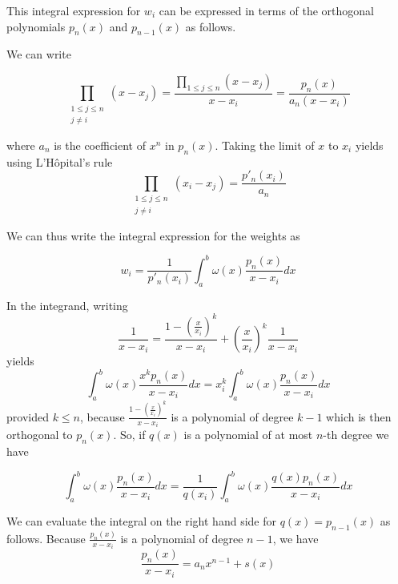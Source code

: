 This integral expression for $w_{i}$ can be expressed in terms of the orthogonal polynomials $p_{n}(x)$ and $p_{n-1}(x)$ as follows.

We can write

\begin{equation}
\prod_{\begin{smallmatrix}1\leq j\leq n\\j\neq i\end{smallmatrix}}\left(x-x_{j}\right) = \frac{\prod_{1\leq j\leq n} \left(x - x_{j}\right)}{x-x_{i}} = \frac{p_{n}(x)}{a_{n}\left(x-x_{i}\right)}
\end{equation}

where $a_{n}$ is the coefficient of $x^n$ in $p_{n}(x)$. Taking the limit of $x$ to $x_{i}$ yields using L'Hôpital's rule
\begin{equation}
\prod_{\begin{smallmatrix}1\leq j\leq n\\j\neq i\end{smallmatrix}}\left(x_{i}-x_{j}\right) = \frac{p'_{n}(x_{i})}{a_{n}}    
\end{equation}


 We can thus write the integral expression for the weights as

 \begin{equation}
     w_{i} = \frac{1}{p'_{n}(x_{i})}\int_{a}^{b}\omega(x)\frac{p_{n}(x)}{x-x_{i}}dx
 \end{equation}

 In the integrand, writing
 \begin{equation}
     \frac{1}{x-x_i} = \frac{1 - \left(\frac{x}{x_i}\right)^{k}}{x - x_i} + \left(\frac{x}{x_i}\right)^{k} \frac{1}{x - x_i}
 \end{equation}
 yields
 \begin{equation}
     \int_a^b\omega(x)\frac{x^kp_n(x)}{x-x_i}dx= x_i^k\int_{a}^{b}\omega(x)\frac{p_n(x)}{x-x_i}dx
 \end{equation}
 provided $k \leq n$, because $\frac{1-\left(\frac{x}{x_{i}}\right)^{k}}{x-x_{i}}$ is a polynomial of degree $k-1$ which is then orthogonal to $p_{n}(x)$. So, if $q(x)$ is a polynomial of at most $n$-th degree we have

 \begin{equation}
     \int_{a}^{b}\omega(x)\frac{p_{n}(x)}{x-x_{i}}dx=\frac{1}{q(x_{i})}\int_{a}^{b}\omega(x)\frac{q(x)p_{n}(x)}{x-x_{i}}dx 
 \end{equation}
   
 We can evaluate the integral on the right hand side for $q(x) = p_{n-1}(x)$ as follows. Because $\frac{p_{n}(x)}{x-x_{i}}$ is a polynomial of degree $n-1$, we have
 \begin{equation}
     \frac{p_{n}(x)}{x-x_{i}} = a_{n}x^{n-1} + s(x)
 \end{equation}

